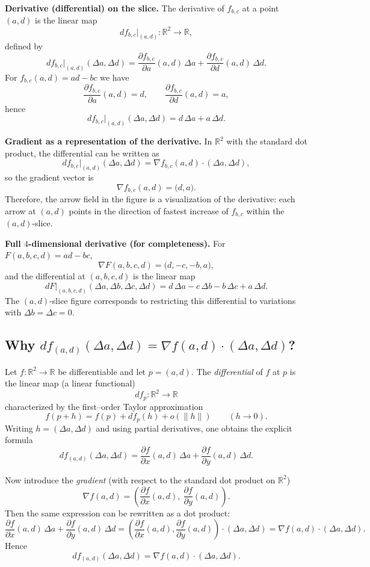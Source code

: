 \documentclass[12pt,a4paper]{article}
\theoremstyle{plain}
\theoremstyle{definition}      %
\begin{document}
	\medskip
	\noindent\textbf{Derivative (differential) on the slice.}
	The derivative of $f_{b,c}$ at a point $(a,d)$ is the linear map
	\[
	df_{b,c}\big|_{(a,d)}:\mathbb{R}^2\to\mathbb{R},
	\]
	defined by
	\[
	df_{b,c}\big|_{(a,d)}(\Delta a,\Delta d)
	=\frac{\partial f_{b,c}}{\partial a}(a,d)\,\Delta a
	+\frac{\partial f_{b,c}}{\partial d}(a,d)\,\Delta d.
	\]
	For $f_{b,c}(a,d)=ad-bc$ we have
	\[
	\frac{\partial f_{b,c}}{\partial a}(a,d)=d,
	\qquad
	\frac{\partial f_{b,c}}{\partial d}(a,d)=a,
	\]
	hence
	\[
	\boxed{
		df_{b,c}\big|_{(a,d)}(\Delta a,\Delta d)=d\,\Delta a+a\,\Delta d.}
	\]
	
	\medskip
	\noindent\textbf{Gradient as a representation of the derivative.}
	In $\mathbb{R}^2$ with the standard dot product, the differential can be written as
	\[
	df_{b,c}\big|_{(a,d)}(\Delta a,\Delta d)=\nabla f_{b,c}(a,d)\cdot(\Delta a,\Delta d),
	\]
	so the gradient vector is
	\[
	\boxed{\nabla f_{b,c}(a,d)=\big(d,a\big).}
	\]
	Therefore, the arrow field in the figure is a visualization of the derivative:
	each arrow at $(a,d)$ points in the direction of fastest increase of $f_{b,c}$ within the $(a,d)$-slice.
	
	\medskip
	\noindent\textbf{Full $4$-dimensional derivative (for completeness).}
	For $F(a,b,c,d)=ad-bc$,
	\[
	\nabla F(a,b,c,d)=\big(d,-c,-b,a\big),
	\]
	and the differential at $(a,b,c,d)$ is the linear map
	\[
	\boxed{
		dF\big|_{(a,b,c,d)}(\Delta a,\Delta b,\Delta c,\Delta d)
		=d\,\Delta a-c\,\Delta b-b\,\Delta c+a\,\Delta d.}
	\]
	The $(a,d)$-slice figure corresponds to restricting this differential to variations with $\Delta b=\Delta c=0$.
	
	\subsection*{Why $df_{(a,d)}(\Delta a,\Delta d)=\nabla f(a,d)\cdot(\Delta a,\Delta d)$?}
	
	Let $f:\mathbb{R}^2\to\mathbb{R}$ be differentiable and let $p=(a,d)$.
	The \emph{differential} of $f$ at $p$ is the linear map (a linear functional)
	\[
	df_p:\mathbb{R}^2\to\mathbb{R}
	\]
	characterized by the first--order Taylor approximation
	\[
	f(p+h)=f(p)+df_p(h)+o(\|h\|)\qquad (h\to 0).
	\]
	Writing $h=(\Delta a,\Delta d)$ and using partial derivatives, one obtains the explicit formula
	\[
	df_{(a,d)}(\Delta a,\Delta d)=
	\frac{\partial f}{\partial x}(a,d)\,\Delta a
	+\frac{\partial f}{\partial y}(a,d)\,\Delta d.
	\]
	
	Now introduce the \emph{gradient} (with respect to the standard dot product on $\mathbb{R}^2$)
	\[
	\nabla f(a,d)=\left(\frac{\partial f}{\partial x}(a,d),\ \frac{\partial f}{\partial y}(a,d)\right).
	\]
	Then the same expression can be rewritten as a dot product:
	\[
	\frac{\partial f}{\partial x}(a,d)\,\Delta a
	+\frac{\partial f}{\partial y}(a,d)\,\Delta d
	=
	\left(\frac{\partial f}{\partial x}(a,d),\frac{\partial f}{\partial y}(a,d)\right)\cdot(\Delta a,\Delta d)
	=
	\nabla f(a,d)\cdot(\Delta a,\Delta d).
	\]
	Hence
	\[
	df_{(a,d)}(\Delta a,\Delta d)=\nabla f(a,d)\cdot(\Delta a,\Delta d).
	\]
	
\end{document}
